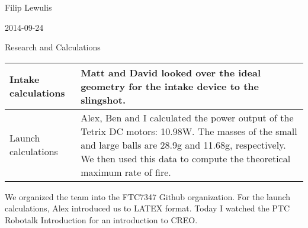 Filip Lewulis

2014-09-24

Research and Calculations

\begin{tabular}{|p{5cm}|p{5cm}|}
  \hline
Intake calculations
  &
Matt and David looked over the ideal geometry for the intake device to the slingshot.
\\
\hline
Launch calculations
  &
Alex, Ben and I calculated the power output of the Tetrix DC motors: 10.98W. The masses of the small and large balls are 28.9g and 11.68g, respectively. We then used this data to compute the theoretical maximum rate of fire.
\\
  \hline
\end{tabular}

We organized the team into the FTC7347 Github organization. For the launch calculations,
Alex introduced us to LATEX format. Today I watched the PTC Robotalk Introduction for
an introduction to CREO.
